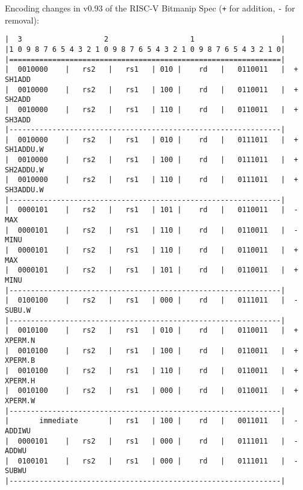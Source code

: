 Encoding changes in v0.93 of the RISC-V Bitmanip Spec ({\tt +} for addition,
{\tt -} for removal):

\begin{minipage}{\linewidth}
\begin{verbatim}
|  3                   2                   1                    |
|1 0 9 8 7 6 5 4 3 2 1 0 9 8 7 6 5 4 3 2 1 0 9 8 7 6 5 4 3 2 1 0|
|===============================================================|
|  0010000    |   rs2   |   rs1   | 010 |    rd   |   0110011   |  + SH1ADD
|  0010000    |   rs2   |   rs1   | 100 |    rd   |   0110011   |  + SH2ADD
|  0010000    |   rs2   |   rs1   | 110 |    rd   |   0110011   |  + SH3ADD
|---------------------------------------------------------------|
|  0010000    |   rs2   |   rs1   | 010 |    rd   |   0111011   |  + SH1ADDU.W
|  0010000    |   rs2   |   rs1   | 100 |    rd   |   0111011   |  + SH2ADDU.W
|  0010000    |   rs2   |   rs1   | 110 |    rd   |   0111011   |  + SH3ADDU.W
|---------------------------------------------------------------|
|  0000101    |   rs2   |   rs1   | 101 |    rd   |   0110011   |  - MAX
|  0000101    |   rs2   |   rs1   | 110 |    rd   |   0110011   |  - MINU
|  0000101    |   rs2   |   rs1   | 110 |    rd   |   0110011   |  + MAX
|  0000101    |   rs2   |   rs1   | 101 |    rd   |   0110011   |  + MINU
|---------------------------------------------------------------|
|  0100100    |   rs2   |   rs1   | 000 |    rd   |   0111011   |  - SUBU.W
|---------------------------------------------------------------|
|  0010100    |   rs2   |   rs1   | 010 |    rd   |   0110011   |  + XPERM.N
|  0010100    |   rs2   |   rs1   | 100 |    rd   |   0110011   |  + XPERM.B
|  0010100    |   rs2   |   rs1   | 110 |    rd   |   0110011   |  + XPERM.H
|  0010100    |   rs2   |   rs1   | 000 |    rd   |   0110011   |  + XPERM.W
|---------------------------------------------------------------|
|       immediate       |   rs1   | 100 |    rd   |   0011011   |  - ADDIWU
|  0000101    |   rs2   |   rs1   | 000 |    rd   |   0111011   |  - ADDWU
|  0100101    |   rs2   |   rs1   | 000 |    rd   |   0111011   |  - SUBWU
|---------------------------------------------------------------|
\end{verbatim}
\end{minipage}

